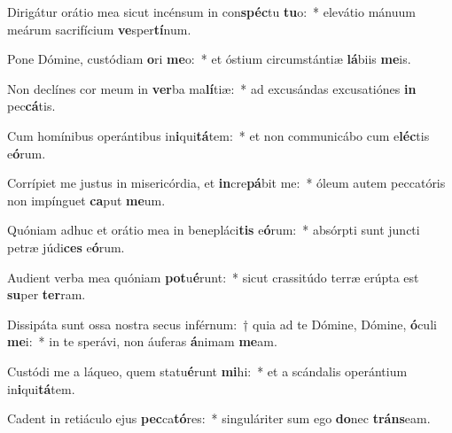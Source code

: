 \item Dirigátur orátio mea sicut incénsum in con\textbf{spéc}tu \textbf{tu}o:~* elevátio mánuum meárum sacrifícium \textbf{ve}sper\textbf{tí}num.
\item Pone Dómine, custódiam \textbf{o}ri \textbf{me}o:~* et óstium circumstántiæ \textbf{lá}biis \textbf{me}is.
\item Non declínes cor meum in \textbf{ver}ba ma\textbf{lí}tiæ:~* ad excusándas excusatiónes \textbf{in} pec\textbf{cá}tis.
\item Cum homínibus operántibus in\textbf{i}qui\textbf{tá}tem:~* et non communicábo cum e\textbf{léc}tis e\textbf{ó}rum.
\item Corrípiet me justus in misericórdia, et \textbf{in}cre\textbf{pá}bit me:~* óleum autem peccatóris non impínguet \textbf{ca}put \textbf{me}um.
\item Quóniam adhuc et orátio mea in benepláci\textbf{tis} e\textbf{ó}rum:~* absórpti sunt juncti petræ júdi\textbf{ces} e\textbf{ó}rum.
\item Audient verba mea quóniam \textbf{pot}u\textbf{é}runt:~* sicut crassitúdo terræ erúpta est \textbf{su}per \textbf{ter}ram.
\item Dissipáta sunt ossa nostra secus inférnum:~† quia ad te Dómine, Dómine, \textbf{ó}culi \textbf{me}i:~* in te sperávi, non áuferas \textbf{á}nimam \textbf{me}am.
\item Custódi me a láqueo, quem statu\textbf{é}runt \textbf{mi}hi:~* et a scándalis operántium in\textbf{i}qui\textbf{tá}tem.
\item Cadent in retiáculo ejus \textbf{pec}ca\textbf{tó}res:~* singuláriter sum ego \textbf{do}nec \textbf{tráns}eam.
